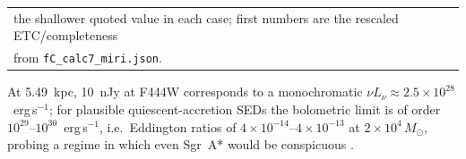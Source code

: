\documentclass[11pt]{article}
\newcommand{\msun}{\ensuremath{M_\odot}}
\begin{document}
\begin{table}[htbp]
\begin{tabular}{lccrrcl}
\multicolumn{7}{l}{\footnotesize \phantom{\textsuperscript{a}} the shallower quoted value in each case; first numbers are the rescaled ETC/completeness} \\
\multicolumn{7}{l}{\footnotesize \phantom{\textsuperscript{a}} from \texttt{fC\_calc7\_miri.json}.} \\
\end{tabular}
\end{table} At 5.49~kpc, 10~nJy at F444W corresponds to a monochromatic $\nu L_{\nu} \approx 2.5\times10^{28}$~erg\,s$^{-1}$; for plausible quiescent-accretion SEDs the bolometric limit is of order $10^{29}$--$10^{30}$~erg\,s$^{-1}$, i.e.\ Eddington ratios of $4\times10^{-14}$--$4\times10^{-13}$ at $2\times10^{4}\,\msun$, probing a regime in which even Sgr~A* would be conspicuous \citep{EHT2022SgrAI}.
\end{document}
